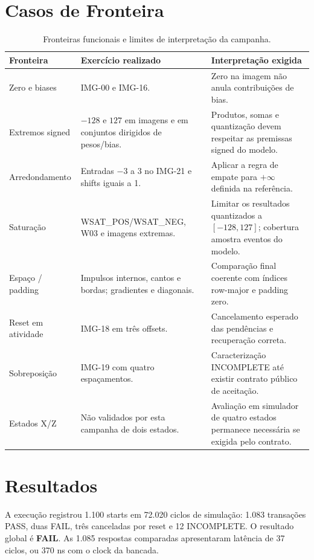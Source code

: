 \documentclass[12pt,a4paper]{article}
\begin{document}
\section{Casos de Fronteira}
\begin{table}[H]\centering\small
\begin{tabularx}{\textwidth}{>{\raggedright\arraybackslash}p{4.8cm}>{\raggedright\arraybackslash}X>{\raggedright\arraybackslash}p{7.6cm}}\toprule
\textbf{Fronteira} & \textbf{Exercício realizado} & \textbf{Interpretação exigida}\\\midrule
Zero e biases & IMG-00 e IMG-16. & Zero na imagem não anula contribuições de bias.\\
Extremos signed & $-128$ e $127$ em imagens e em conjuntos dirigidos de pesos/bias. & Produtos, somas e quantização devem respeitar as premissas signed do modelo.\\
Arredondamento & Entradas $-3$ a $3$ no IMG-21 e shifts iguais a 1. & Aplicar a regra de empate para $+\infty$ definida na referência.\\
Saturação & WSAT\_POS/WSAT\_NEG, W03 e imagens extremas. & Limitar os resultados quantizados a $[-128,127]$; cobertura amostra eventos do modelo.\\
Espaço / padding & Impulsos internos, cantos e bordas; gradientes e diagonais. & Comparação final coerente com índices row-major e padding zero.\\
Reset em atividade & IMG-18 em três offsets. & Cancelamento esperado das pendências e recuperação correta.\\
Sobreposição & IMG-19 com quatro espaçamentos. & Caracterização INCOMPLETE até existir contrato público de aceitação.\\
Estados X/Z & Não validados por esta campanha de dois estados. & Avaliação em simulador de quatro estados permanece necessária se exigida pelo contrato.\\\bottomrule
\end{tabularx}
\caption{Fronteiras funcionais e limites de interpretação da campanha.}
\end{table}

\section{Resultados}
A execução registrou 1.100 starts em 72.020 ciclos de simulação: 1.083 transações PASS, duas FAIL, três canceladas por reset e 12 INCOMPLETE. O resultado global é \textbf{FAIL}. As 1.085 respostas comparadas apresentaram latência de 37 ciclos, ou 370 ns com o clock da bancada.
\end{document}
